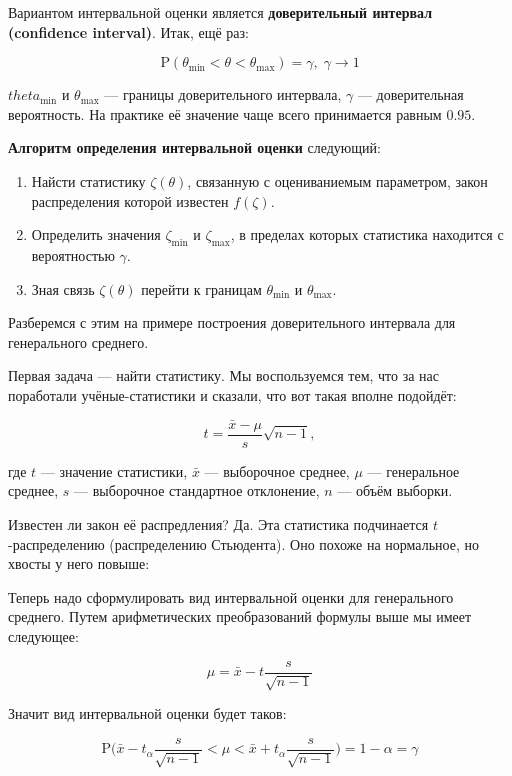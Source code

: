 \documentclass[
  letterpaper,
  DIV=11,
  numbers=noendperiod]{scrreprt}
\providecommand{\tightlist}{%
  \setlength{\itemsep}{0pt}\setlength{\parskip}{0pt}}\usepackage{longtable,booktabs,array}
\newcommand{\def}{\overset{\text{def}}{=}}
\theoremstyle{definition}
\theoremstyle{remark}
\begin{document}
Вариантом интервальной оценки является \textbf{доверительный интервал
(confidence interval)}. Итак, ещё раз:

\[
\mathrm{P}(\theta_\min < \theta < \theta_\max) = \gamma, \; \gamma \rightarrow 1
\]

\(theta_\min\) и \(\theta_\max\) --- границы доверительного интервала,
\(\gamma\) --- доверительная вероятность. На практике её значение чаще
всего принимается равным \(0.95\).

\textbf{Алгоритм определения интервальной оценки} следующий:

\begin{enumerate}
\def{}
\tightlist
\item
  Найсти статистику \(\zeta(\theta)\), связанную с оцениваниемым
  параметром, закон распределения которой известен \(f(\zeta)\).
\item
  Определить значения \(\zeta_\min\) и \(\zeta_\max\), в пределах
  которых статистика находится с вероятностью \(\gamma\).
\item
  Зная связь \(\zeta(\theta)\) перейти к границам \(\theta_\min\) и
  \(\theta_\max\).
\end{enumerate}

Разберемся с этим на примере построения доверительного интервала для
генерального среднего.

Первая задача --- найти статистику. Мы воспользуемся тем, что за нас
поработали учёные-статистики и сказали, что вот такая вполне подойдёт:

\[
t = \frac{\bar x - \mu}{s}\sqrt{n-1},
\]

где \(t\) --- значение статистики, \(\bar x\) --- выборочное среднее,
\(\mu\) --- генеральное среднее, \(s\) --- выборочное стандартное
отклонение, \(n\) --- объём выборки.

Известен ли закон её распредления? Да. Эта статистика подчинается
\(t\)-распределению (распределению Стьюдента). Оно похоже на нормальное,
но хвосты у него повыше:

Теперь надо сформулировать вид интервальной оценки для генерального
среднего. Путем арифметических преобразований формулы выше мы имеет
следующее:

\[
\mu = \bar x - t \frac{s}{\sqrt{n-1}}
\]

Значит вид интервальной оценки будет таков:

\[
\mathrm{P}\Big( \bar x - t_\alpha \frac{s}{\sqrt{n-1}} < \mu < 
\bar x + t_\alpha \frac{s}{\sqrt{n-1}}\Big) = 1 - \alpha = \gamma
\]
\end{document}
